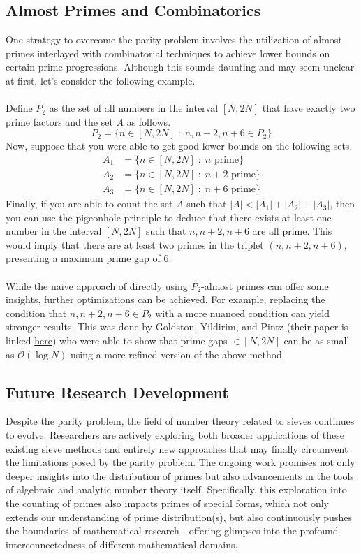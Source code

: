 \documentclass[10pt]{extarticle}
\begin{document}
\subsection{Almost Primes and Combinatorics}
One strategy to overcome the parity problem involves the utilization of almost primes interlayed with combinatorial techniques to achieve lower bounds on certain prime progressions.
Although this sounds daunting and may seem unclear at first, let's consider the following example.\\
\\
Define $P_2$ as the set of all numbers in the interval $[N,2N]$ that have exactly two prime factors and the set $A$ as follows.
$$
P_2 = \{n \in [N,2N] \;:\; n, n+2, n+6 \in P_2\}
$$
Now, suppose that you were able to get good lower bounds on the following sets.
\begin{align*}
  A_1 &= \{n \in [N,2N] \;:\; n \text{ prime}\}\\
  A_2 &= \{n \in [N,2N] \;:\; n+2 \text{ prime}\}\\
  A_3 &= \{n \in [N,2N] \;:\; n+6 \text{ prime}\}
\end{align*}
Finally, if you are able to count the set $A$ such that $|A| < |A_1| + |A_2| + |A_3|$, then you can use the pigeonhole principle to deduce that there exists at least one number in the interval $[N,2N]$ such that $n, n+2, n+6$ are all prime. This would imply that there are at least two primes in the triplet $(n,n+2,n+6)$, presenting a maximum prime gap of $6$.\\
\\
While the naive approach of directly using $P_2$-almost primes can offer some insights, further optimizations can be achieved. For example, replacing the condition that $n, n+2, n+6 \in P_2$ with a more nuanced condition can yield stronger results. 
This was done by Goldston, Yildirim, and Pintz (their paper is linked \href{https://terrytao.wordpress.com/2007/06/05/open-question-the-parity-problem-in-sieve-theory/}{here}) who were able to show that prime gaps $\in [N,2N]$ can be as small as $\mathcal{O}\left(\log N\right)$ using a more refined version of the above method. 



\subsection{Future Research Development}
Despite the parity problem, the field of number theory related to sieves continues to evolve. 
Researchers are actively exploring both broader applications of these existing sieve methods and entirely new approaches that may finally circumvent the limitations posed by the parity problem. 
The ongoing work promises not only deeper insights into the distribution of primes but also advancements in the tools of algebraic and analytic number theory itself.
Specifically, this exploration into the counting of primes also impacts primes of special forms, which not only extends our understanding of prime distribution(s), but also continuously pushes the boundaries of mathematical research - offering glimpses into the profound interconnectedness of different mathematical domains.
\end{document}
